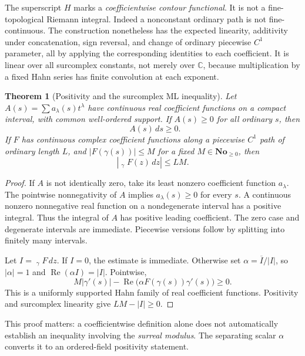 \documentclass[11pt,letterpaper]{article}
\newtheorem{theorem}{Theorem}[section]
\theoremstyle{definition}
\theoremstyle{remark}
\newcommand{\No}{\mathbf{No}}
\newcommand{\C}{\mathbb C}
\newcommand{\re}{\operatorname{Re}}
\newcommand{\HInt}{\mathop{\int^{\!H}}\nolimits}
\numberwithin{equation}{section}
\begin{document}
The superscript $H$ marks a \emph{coefficientwise contour functional}. It is not a fine-topological Riemann integral. Indeed a nonconstant ordinary path is not fine-continuous. The construction nonetheless has the expected linearity, additivity under concatenation, sign reversal, and change of ordinary piecewise $C^1$ parameter, all by applying the corresponding identities to each coefficient. It is linear over all surcomplex constants, not merely over $\C$, because multiplication by a fixed Hahn series has finite convolution at each exponent.

\begin{theorem}[Positivity and the surcomplex ML inequality]\label{thm:ML}
Let $A(s)=\sum a_\lambda(s)t^\lambda$ have continuous real coefficient functions on a compact interval, with common well-ordered support. If $A(s)\ge0$ for all ordinary $s$, then
\[
 \HInt A(s)\,ds\ge0.
\]
If $F$ has continuous complex coefficient functions along a piecewise $C^1$ path of ordinary length $L$, and $|F(\gamma(s))|\le M$ for a fixed $M\in\No_{\ge0}$, then
\begin{equation}\label{eq:ML}
 \left|\HInt_\gamma F(z)\,dz\right|\le LM.
\end{equation}
\end{theorem}
\begin{proof}
If $A$ is not identically zero, take its least nonzero coefficient function $a_\lambda$. The pointwise nonnegativity of $A$ implies $a_\lambda(s)\ge0$ for every $s$. A continuous nonzero nonnegative real function on a nondegenerate interval has a positive integral. Thus the integral of $A$ has positive leading coefficient. The zero case and degenerate intervals are immediate. Piecewise versions follow by splitting into finitely many intervals.

Let $I=\HInt_\gamma F\,dz$. If $I=0$, the estimate is immediate. Otherwise set $\alpha=\overline I/|I|$, so $|\alpha|=1$ and $\re(\alpha I)=|I|$. Pointwise,
\[
 M|\gamma'(s)|-\re\bigl(\alpha F(\gamma(s))\gamma'(s)\bigr)\ge0.
\]
This is a uniformly supported Hahn family of real coefficient functions. Positivity and surcomplex linearity give $LM-|I|\ge0$.
\end{proof}
This proof matters: a coefficientwise definition alone does not automatically establish an inequality involving the \emph{surreal modulus}. The separating scalar $\alpha$ converts it to an ordered-field positivity statement.
\end{document}
